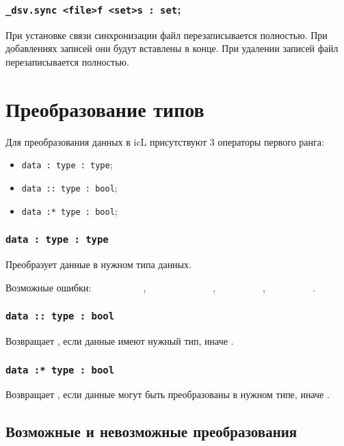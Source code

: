 \documentclass[a4paper, 14pt]{extarticle}
\newcommand{\ferror}[1]{{\fontsize{11pt}{12pt} \tt \colorbox{function}{\textcolor{white}{#1}}}}
\newenvironment{icItems}
	{ \begin{itemize} [noitemsep,nolistsep] }
	{ \end{itemize} }
\begin{document}
\subsubsection{\lstinline|_dsv.sync <file>f <set>s : set|;}

При установке связи синхронизации файл перезаписывается полностью. При добавлениях записей они будут вставлены в конце. При удалении записей файл перезаписывается полностью.

\newpage
\section{Преобразование типов}

Для преобразования данных в icL присутствуют 3 операторы первого ранга:
\begin{icItems}
	\item \lstinline|data : type : type|;
	\item \lstinline|data :: type : bool|;
	\item \lstinline|data :* type : bool|;
\end{icItems}

\subsubsection{\lstinline|data : type : type|}

Преобразует данные в нужном типа данных.

Возможные ошибки: \ferror{UnrealCast}, \ferror{ParsingFailed}, \ferror{EmptyList}, \ferror{MultiList}.

\subsubsection{\lstinline|data :: type : bool|}

Возвращает \true, если данные имеют нужный тип, иначе \false.

\subsubsection{\lstinline|data :* type : bool|}

Возвращает \true, если данные могут быть преобразованы в нужном типе, иначе \false.

\subsection{Возможные и невозможные преобразования}
\end{document}
